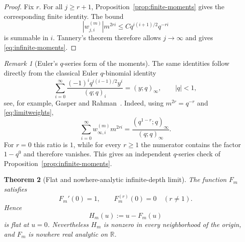 \documentclass[11pt]{article}
\newtheorem{theorem}{Theorem}[section]
\theoremstyle{remark}
\newtheorem{remark}[theorem]{Remark}
\begin{document}
\begin{proof}
Fix $r$.  For all $j\ge r+1$, Proposition~\ref{prop:finite-moments} gives the
corresponding finite identity.  The bound
\[
|w^{(m)}_{j,i}|m^{2ri}
\le Cq^{i(i+1)/2}q^{-ri}
\]
is summable in $i$.  Tannery's theorem therefore allows $j\to\infty$ and
gives \eqref{eq:infinite-moments}.
\end{proof}

\begin{remark}[Euler's $q$-series form of the moments]
The same identities follow directly from the classical Euler
$q$-binomial identity
\[
\sum_{i=0}^{\infty}
\frac{(-1)^i q^{i(i-1)/2}y^i}{(q;q)_i}
=(y;q)_\infty,
\qquad |q|<1,
\]
see, for example, Gasper and Rahman~\cite{GasperRahman2004}.  Indeed,
using $m^{2r}=q^{-r}$ and \eqref{eq:limitweights},
\[
\sum_{i=0}^{\infty}w^{(m)}_{\infty,i}m^{2ri}
=
\frac{(q^{1-r};q)_\infty}{(q;q)_\infty}.
\]
For $r=0$ this ratio is $1$, while for every $r\ge1$ the numerator contains
the factor $1-q^0$ and therefore vanishes.  This gives an independent
$q$-series check of Proposition~\ref{prop:infinite-moments}.
\end{remark}

\begin{theorem}[Flat and nowhere-analytic infinite-depth limit]
\label{thm:flat}
The function $F_m$ satisfies
\begin{equation}
F_m'(0)=1,
\qquad
F_m^{(r)}(0)=0\quad(r\ne1).
\label{eq:jetF}
\end{equation}
Hence
\begin{equation}
H_m(u):=u-F_m(u)
\label{eq:Hm}
\end{equation}
is flat at $u=0$.
Nevertheless $H_m$ is nonzero in every neighborhood of the origin, and $F_m$
is nowhere real analytic on $\mathbb R$.
\end{theorem}
\end{document}
